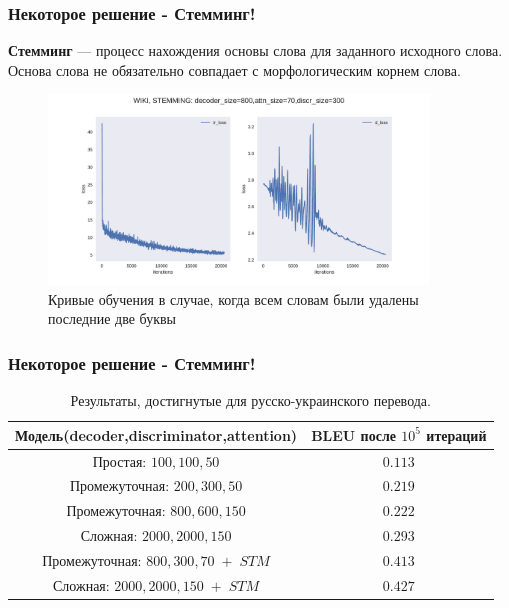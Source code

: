 \documentclass[10pt,pdf,hyperref={unicode}]{beamer}
\begin{document}
\begin{frame}
	\frametitle{Некоторое решение - Стемминг!} 
	\begin{center}
		
		\textbf{Стемминг} — процесс нахождения основы слова для заданного исходного слова. Основа слова не обязательно совпадает с морфологическим корнем слова.
		
		\begin{figure}[h]
			\centering
			\includegraphics[width=0.9\textwidth]{WIKI,decoder_size=800,attn_size=70,discr_size=300.pdf}
			\caption{Кривые обучения в случае, когда всем словам были удалены последние две буквы}
		\end{figure}
		
	\end{center}
\end{frame}

\begin{frame}
	\frametitle{Некоторое решение - Стемминг!} 
	\begin{center}
	
	\begin{table}[H]
		\caption{\label{tab:canonsummary}Результаты, достигнутые для русско-украинского перевода.}
		\begin{center}
			\begin{tabular}{|c|c|}
				\hline
				Модель(decoder,discriminator,attention) & BLEU после $10^5$ итераций \\
				\hline
				Простая: $100, 100, 50$ & $0.113$ \\
				Промежуточная: $200, 300, 50$ & $0.219$ \\
				Промежуточная: $800, 600, 150$ & $0.222$ \\
				Сложная: $2000, 2000, 150$ & \underline{ $0.293$ } \\
				\hline
				Промежуточная: $800, 300, 70 \; + \; STM$ & $0.413$ \\
				Сложная: $2000, 2000, 150 \; + \; STM$ & $0.427$ \\
				\hline
	
			\end{tabular}
		\end{center}
	\end{table} 
		
	\end{center}
\end{frame}
\end{document}
